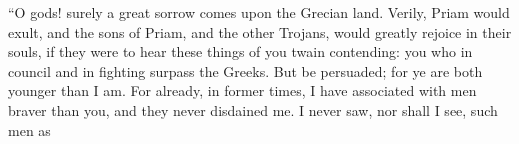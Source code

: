 \documentclass{ransom}
\begin{document}
“Ο gods! surely a great sorrow comes upon the Grecian land. Verily,
Priam would exult, and the sons of Priam, and the other Trojans, would
greatly rejoice in their souls, if they were to hear these things of
you twain contending: you who in council and in fighting surpass the
Greeks. But be persuaded; for ye are both younger than I am. For
already, in former times, I have associated with men braver than you,
and they never disdained me. I never saw, nor shall I see, such men as\begin{vocabpage}
\begin{vocabcommon}
\\\\\\\\\\\\\\\\\\\\\\\\\\\\\\\\\\\\\\\\\\\\\\\\\\\end{vocabcommon}
\begin{vocabuncommon}

\end{vocabuncommon}
\end{vocabpage}
\end{document}
